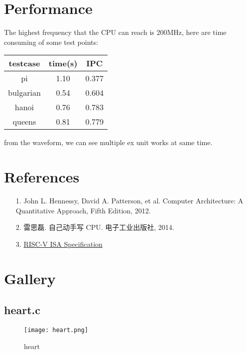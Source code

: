 \documentclass[UTF8]{ctexart}
\begin{document}
\section{Performance}
    The highest frequency that the CPU can reach is 200MHz, here are time consuming of some test points:
    \begin{center}
        \begin{tabular}{ccc}
            \hline
            testcase & time(s) & IPC \\
            \hline
            pi & 1.10  & 0.377\\
            \hline
            bulgarian & 0.54  & 0.604\\
            \hline
            hanoi & 0.76  & 0.783\\
            \hline
            queens & 0.81  & 0.779\\
            \hline
        \end{tabular}
    \end{center}
    from the waveform, we can see multiple ex unit works at same time.
\section{References}
    \begin{itemize}
        \item [1.] 
        John L. Hennessy, David A. Patterson, et al. Computer Architecture: A Quantitative Approach, Fifth Edition, 2012.
        \item [2.]
        雷思磊. 自己动手写 CPU. 电子工业出版社, 2014.
        \item [3.]
        \href{http://riscv.org/specifications/}{RISC-V ISA Specification}
    \end{itemize}

\newpage
\section{Gallery}
\subsection{heart.c}

\begin{figure}[h]
    \texttt{[image: heart.png]}
    \caption{heart}
\end{figure}
\end{document}

